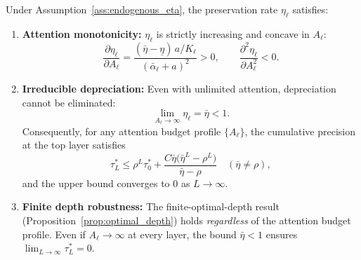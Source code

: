 \begin{proposition}\label{prop:eta_bar_bound}
Under Assumption~\ref{ass:endogenous_eta}, the preservation rate $\eta_\ell$ satisfies:
\begin{enumerate}[label=(\roman*)]
\item \textbf{Attention monotonicity:} $\eta_\ell$ is strictly increasing and concave in $A_\ell$:
\begin{equation}\label{eq:eta_increasing}
\frac{\partial \eta_\ell}{\partial A_\ell} = \frac{(\bar{\eta} - \underline{\eta}) \, a / K_\ell}{(\bar{\alpha}_\ell + a)^2} > 0, \qquad \frac{\partial^2 \eta_\ell}{\partial A_\ell^2} < 0.
\end{equation}

\item \textbf{Irreducible depreciation:} Even with unlimited attention, depreciation cannot be eliminated:
\begin{equation}\label{eq:eta_bar_limit}
\lim_{A_\ell \to \infty} \eta_\ell = \bar{\eta} < 1.
\end{equation}
Consequently, for any attention budget profile $\{A_\ell\}$, the cumulative precision at the top layer satisfies
\begin{equation}\label{eq:tau_L_upper_bound}
\tau^{*}_L \leq \rho^{L} \tau^{*}_{0} + \frac{C\bar{\eta}\bigl(\bar{\eta}^{L} - \rho^{L}\bigr)}{\bar{\eta} - \rho} \quad (\bar{\eta} \neq \rho),
\end{equation}
and the upper bound converges to $0$ as $L \to \infty$.

\item \textbf{Finite depth robustness:} The finite-optimal-depth result (Proposition~\ref{prop:optimal_depth}) holds \emph{regardless} of the attention budget profile. Even if $A_\ell \to \infty$ at every layer, the bound $\bar{\eta} < 1$ ensures $\lim_{L \to \infty} \tau^{*}_L = 0$.
\end{enumerate}
\end{proposition}

